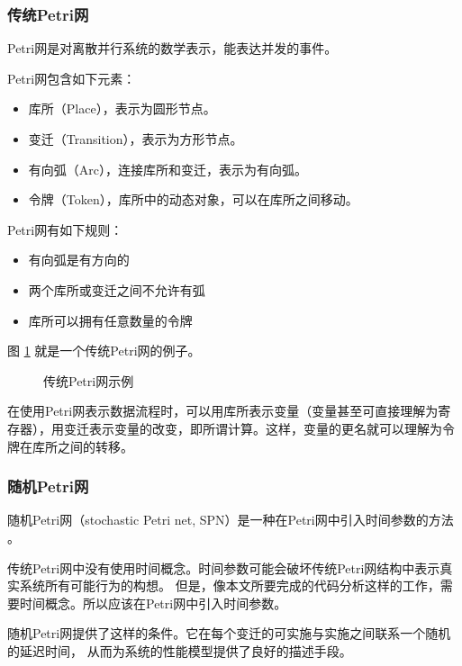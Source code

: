 \subsubsection{传统Petri网}
Petri网是对离散并行系统的数学表示，能表达并发的事件\cite{wikipnet}。

Petri网包含如下元素：

{
\begin{itemize}
    \addtolength{\itemindent}{2.5em}
    \item 库所（Place），表示为圆形节点。
    \item 变迁（Transition），表示为方形节点。
    \item 有向弧（Arc），连接库所和变迁，表示为有向弧。
    \item 令牌（Token），库所中的动态对象，可以在库所之间移动。
\end{itemize}
}

Petri网有如下规则：

{
\begin{itemize}
    \addtolength{\itemindent}{2.5em}
    \item 有向弧是有方向的
    \item 两个库所或变迁之间不允许有弧
    \item 库所可以拥有任意数量的令牌
\end{itemize}
}

图 \ref{fig:pneteg} 就是一个传统Petri网的例子。

\newsavebox{\pneteg}
\begin{figure}[!hbt]
\centering
\usebox{\pneteg}
\caption{传统Petri网示例 \cite{pneteg}} \label{fig:pneteg}
\end{figure}

在使用Petri网表示数据流程时，可以用库所表示变量（变量甚至可直接理解为寄存器），用变迁表示变量的改变，即所谓计算。这样，变量的更名就可以理解为令牌在库所之间的转移。

\subsubsection{随机Petri网}
随机Petri网（stochastic Petri net, SPN）是一种在Petri网中引入时间参数的方法 \cite{spn}。

传统Petri网中没有使用时间概念。时间参数可能会破坏传统Petri网结构中表示真实系统所有可能行为的构想。
但是，像本文所要完成的代码分析这样的工作，需要时间概念。所以应该在Petri网中引入时间参数。

随机Petri网提供了这样的条件。它在每个变迁的可实施与实施之间联系一个随机的延迟时间，
从而为系统的性能模型提供了良好的描述手段。

